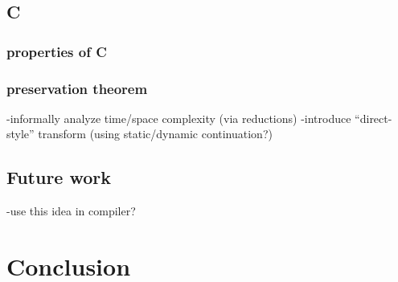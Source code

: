 \documentclass[ms,electronic,twosidetoc,letterpaper,chaptercenter,parttop]{byumsphd}
\begin{document}



    












\section{C}
\subsection{properties of C}
\subsection{preservation theorem}
-informally analyze time/space complexity (via reductions)
-introduce ``direct-style'' transform (using static/dynamic continuation?)
\section{Future work}
-use this idea in compiler?

\chapter{Conclusion}


\end{document}
